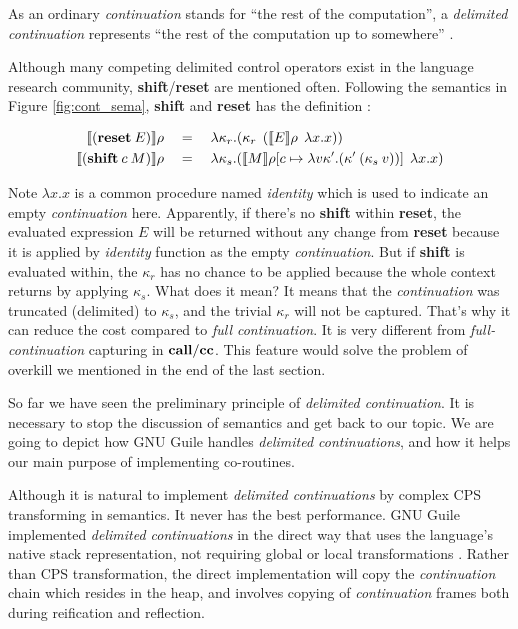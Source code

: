 \documentclass[numbers,numberedpars]{sigplanconf}
\begin{document}
As an ordinary {\it continuation} stands for ``the rest of the computation'', a {\it delimited continuation} represents ``the rest of the computation up to somewhere'' \citep{sumii2000implementation}.

Although many competing delimited control operators exist in the language research community, {\bf shift}/{\bf reset} are mentioned often. Following the semantics in Figure \ref{fig:cont_sema}, {\bf shift} and {\bf reset} has the definition \citep{Danvy92representingcontrol:}:

\begin{align*}
  \llbracket{(\text{{\bf reset}}\:E)}\rrbracket\rho \quad&=\quad \lambda{\kappa_r}.(\kappa_r\:\: (\llbracket{E}\rrbracket\rho\:\: \lambda{x}.x))
  \\
  \llbracket{(\text{{\bf shift}}\:c\:M)}\rrbracket\rho \quad&=\quad
  \lambda{\kappa_s}.(\llbracket{M}\rrbracket\rho[c\mapsto\lambda{v\kappa'}.(\kappa'\:(\kappa_s\:v))]\:\:\lambda{x}.x)
\end{align*}

Note $\lambda{x}.x$ is a common procedure named {\it identity} which is used to indicate an empty {\it continuation} here.
Apparently, if there's no {\bf shift} within {\bf reset}, the evaluated expression $E$ will be returned without any change from {\bf reset} because
it is applied by {\it identity} function as the empty {\it continuation}. But if {\bf shift} is evaluated within, the $\kappa_r$ has no chance to be applied because the whole context returns by applying $\kappa_s$. What does it mean? It means that the {\it continuation} was truncated (delimited) to $\kappa_s$, and the trivial $\kappa_r$ will not be captured. That's why it can reduce the cost compared to {\it full continuation}.
It is very different from {\it full-continuation} capturing in ${\bf call/cc}$. This feature would solve the problem of overkill we mentioned in the end of the last section.

So far we have seen the preliminary principle of {\it delimited continuation}. It is necessary to stop the discussion of semantics and get back to our topic. We are going to depict how GNU Guile handles {\it delimited continuations}, and how it helps our main purpose of implementing co-routines.

Although it is natural to implement {\it delimited continuations} by complex CPS transforming in semantics. It never has the best performance.
GNU Guile implemented {\it delimited continuations} in the direct way that uses the language's native stack representation, not requiring global or local transformations \citep{wingo2010}. Rather than CPS transformation, the direct implementation will copy the {\it continuation} chain which resides in the heap, and involves copying of {\it continuation} frames both during reification and reflection.
\end{document}

